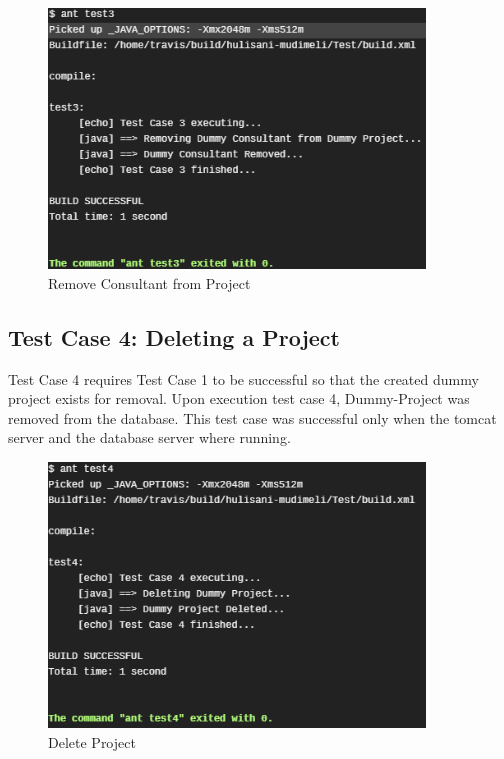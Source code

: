 \documentclass[a4paper, 12pt, oneside]{article}
\begin{document}
\begin{figure}[!htb]

  \centering

\includegraphics[width=10cm]{images/test3.png}

  \caption{Remove Consultant from Project}

  \label{fig:sfig1}

\end{figure}

\pagebreak
\subsection{Test Case 4: Deleting a Project}
Test Case 4 requires Test Case 1 to be successful so that the created dummy project exists for removal. Upon execution test case 4, Dummy-Project was removed from the database. This test case was successful only when the tomcat server and the database server where running.

\begin{figure}[!htb]

  \centering

  \includegraphics[width=10cm]{images/test4.png}

  \caption{Delete Project}

  \label{fig:sfig1}

\end{figure}
\end{document}
